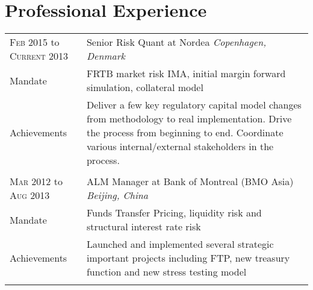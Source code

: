 \documentclass[a4paper,10pt]{article}
\begin{document}
\section{Professional Experience}
\begin{tabular}{R{2.5cm}|L{10.5cm}}
\textsc{Feb} 2015 to  \textsc{Current} 2013 & \large{Senior Risk Quant at Nordea} \emph{Copenhagen, Denmark}
 \\Mandate & FRTB market risk IMA, initial margin forward simulation, collateral model \\
 Achievements &  Deliver a few key regulatory capital model changes from methodology to real implementation. Drive the process from beginning to end. Coordinate various internal/external stakeholders in the process.  \\
\\

\textsc{Mar} 2012 to  \textsc{Aug} 2013 & \large{ALM Manager at Bank of Montreal (BMO Asia) } \emph{Beijing, China}
 \\Mandate & Funds Transfer Pricing, liquidity risk and structural interest rate risk \\
 Achievements &  Launched and implemented several strategic important projects including FTP, new treasury function and new stress testing model\\
\\


\end{tabular}
\end{document}
